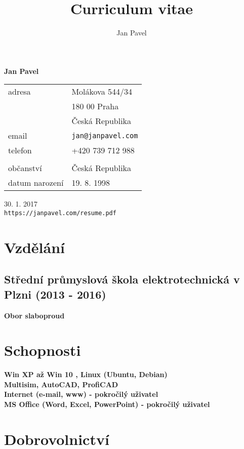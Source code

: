 \documentclass[12pt,a4paper]{article}
\title{Curriculum vitae}
\author{Jan Pavel}
\begin{document}
\begin{center}
{\LARGE \bf Jan Pavel}\\
\vspace*{0.4cm}
\begin{tabular}{R{5cm}L{5cm}}
adresa & Molákova 544/34\\
 & 180 00 Praha\\
 & Česká Republika\\
email & \texttt{jan@janpavel.com}\\
telefon & +420 739 712 988\\
\\
občanství & Česká Republika\\
datum narození & 19. 8. 1998\\
\end{tabular}

\vspace*{0.5cm}
{\hfill 30. 1. 2017}\\
{\hfill \texttt{https://janpavel.com/resume.pdf}}
\end{center}


\section*{Vzdělání}
\subsection*{Střední průmyslová škola elektrotechnická v Plzni (2013 - 2016)}
{\bf Obor slaboproud}


\section*{Schopnosti}

{\bf
Win XP až Win 10 , Linux (Ubuntu, Debian)\\
Multisim, AutoCAD, ProfiCAD\\
Internet (e-mail, www) - pokročilý uživatel\\
MS Office (Word, Excel, PowerPoint) - pokročilý uživatel\\
}

\section*{Dobrovolnictví}
\end{document}
